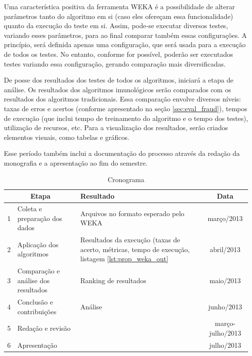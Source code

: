 Uma característica positiva da ferramenta WEKA é a possibilidade de alterar parâmetros tanto do algoritmo em si (caso eles ofereçam essa funcionalidade) quanto da execução do teste em si. Assim, pode-se executar diversos testes, variando esses parâmetros, para ao final comparar também essas configurações. A princípio, será definida apenas uma configuração, que será usada para a execução de todos os testes. No entanto, conforme for possível, poderão ser executados testes variando essa configuração, gerando comparação mais diversificadas.

De posse dos resultados dos testes de todos os algoritmos, iniciará a etapa de análise. Os resultados dos algoritmos imunológicos serão comparados com os resultados dos algoritmos tradicionais. Essa comparação envolve diversos níveis: taxas de erros e acertos (conforme apresentado na seção \ref{sec:eval_fraud}), tempos de execução (que inclui tempo de treinamento do algoritmo e o tempo dos testes), utilização de recursos, etc. Para a visualização dos resultados, serão criados elementos visuais, como tabelas e gráficos.

Esse período também inclui a documentação do processo através da redação da monografia e a apresentação ao fim do semestre.

\begin{table}[h]
    \vspace{1cm}
    \caption{Cronograma}
    \centering
    \begin{tabular}{l >{\arraybackslash}m{4cm} >{\centering\arraybackslash}m{7cm} c}
        \multicolumn{2}{c}{Etapa} & Resultado & Data \\
        \hline
        1 & Coleta e preparação dos dados       & Arquivos no formato esperado pelo WEKA & março/2013 \\
        2 & Aplicação dos algoritmos            & Resultados da execução (taxas de acerto, métricas, tempo de execução, listagem \ref{lst:prop_weka_out} & abril/2013 \\
        3 & Comparação e análise dos resultados & Ranking de resultados & maio/2013 \\
        4 & Conclusão e contribuições           & Análise & junho/2013 \\
        5 & Redação e revisão                   & & março-julho/2013 \\
        6 & Apresentação                        & & julho/2013 \\
    \end{tabular}
    \label{tab:prop_cron}
    \vspace{1cm}
\end{table}
